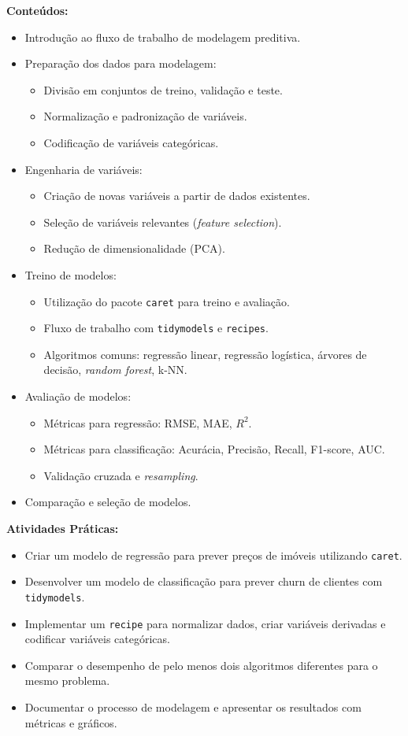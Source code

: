 \documentclass[12pt]{article}
\begin{document}
\textbf{Conteúdos:}
\begin{itemize}
  \item Introdução ao fluxo de trabalho de modelagem preditiva.
  \item Preparação dos dados para modelagem:
    \begin{itemize}
      \item Divisão em conjuntos de treino, validação e teste.
      \item Normalização e padronização de variáveis.
      \item Codificação de variáveis categóricas.
    \end{itemize}
  \item Engenharia de variáveis:
    \begin{itemize}
      \item Criação de novas variáveis a partir de dados existentes.
      \item Seleção de variáveis relevantes (\textit{feature selection}).
      \item Redução de dimensionalidade (PCA).
    \end{itemize}
  \item Treino de modelos:
    \begin{itemize}
      \item Utilização do pacote \texttt{caret} para treino e avaliação.
      \item Fluxo de trabalho com \texttt{tidymodels} e \texttt{recipes}.
      \item Algoritmos comuns: regressão linear, regressão logística, árvores de decisão, \textit{random forest}, k-NN.
    \end{itemize}
  \item Avaliação de modelos:
    \begin{itemize}
      \item Métricas para regressão: RMSE, MAE, $R^2$.
      \item Métricas para classificação: Acurácia, Precisão, Recall, F1-score, AUC.
      \item Validação cruzada e \textit{resampling}.
    \end{itemize}
  \item Comparação e seleção de modelos.
\end{itemize}

\textbf{Atividades Práticas:}
\begin{itemize}
  \item Criar um modelo de regressão para prever preços de imóveis utilizando \texttt{caret}.
  \item Desenvolver um modelo de classificação para prever churn de clientes com \texttt{tidymodels}.
  \item Implementar um \texttt{recipe} para normalizar dados, criar variáveis derivadas e codificar variáveis categóricas.
  \item Comparar o desempenho de pelo menos dois algoritmos diferentes para o mesmo problema.
  \item Documentar o processo de modelagem e apresentar os resultados com métricas e gráficos.
\end{itemize}
\end{document}
